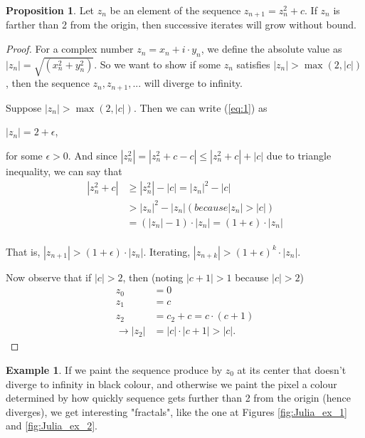 \documentclass[a4paper,11pt]{article}
\theoremstyle{definition}
\newtheorem{prop}{Proposition}[section]
\newtheorem{exmp}{Example}[section]
\numberwithin{equation}{section} %
\begin{document}
\begin{prop}
    Let $z_n$ be an element of the sequence $z_{n+1} = z_n^2 + c$. If $z_n$ is farther than 2 from the origin, then successive iterates will grow without bound.
\end{prop}
\begin{proof}
    For a complex number $z_n = x_n + i \cdot y_n$, we define the absolute value as $|z_n| = \sqrt{(x_n^2 + y_n^2)}$. So we want to show if some $z_n$ satisfies $|z_n| > \max (2, |c|)$, then the sequence $z_n, z_{n+1},...$ will diverge to infinity. 

    Suppose $|z_n| > \max (2, |c|)$. Then we can write (\ref{eq:1}) as 
    \begin{center}
        $|z_n| = 2 + \epsilon$,
    \end{center}
    for some $\epsilon > 0$. And since $|z_n^2| = |z_n^2 + c - c| \le |z_n^2 + c| + |c|$ due to triangle inequality, we can say that
    \begin{align*}
        |z_n^2 + c| &\ge |z_n^2| - |c| = |z_n|^2 - |c| \\
        &> |z_n|^2 - |z_n| (because |z_n| > |c|) \\
        &= (|z_n| - 1)\cdot|z_n| = (1 + \epsilon)\cdot|z_n| \\
    \end{align*}

    That is, $|z_{n+1}| > (1 + \epsilon)\cdot|z_n|$. Iterating, $|z_{n+k}| > (1 + \epsilon)^k\cdot|z_n|$.

    Now observe that if $|c| > 2$, then (noting $|c + 1| > 1$ because $|c| > 2$)
    \begin{align*}
            z_0 &= 0 \\
            z_1 &= c \\
            z_2 &= c_2 + c = c\cdot(c + 1) \\
            \rightarrow |z_2| &= |c|\cdot|c + 1| > |c|.
    \end{align*} 
    
\end{proof}


\begin{exmp}
    If we paint the sequence produce by $z_0$ at its center that doesn't diverge to infinity in black colour, and otherwise we paint the pixel a colour determined by how quickly sequence gets further than 2 from the origin (hence diverges), we get interesting "fractals", like the one at Figures \ref{fig:Julia_ex_1} and \ref{fig:Julia_ex_2}.
\end{exmp}
\end{document}
